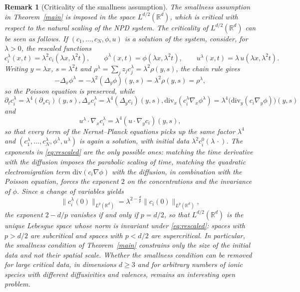\documentclass[11pt,reqno]{amsart}
\newcommand{\be}{\begin{equation}}
\newcommand{\ee}{\end{equation}}
\newtheorem{rem}[thm]{Remark}
\begin{document}
\begin{rem}[Criticality of the smallness assumption]
\label{rem:criticality}
The smallness assumption in Theorem~\ref{main} is imposed in
the space $L^{d/2}(\mathbb{R}^d)$, which is critical with respect to
the natural scaling of the NPD system.
The criticality of $L^{d/2}(\mathbb{R}^d)$ can be seen as follows. If
$(c_1,\dots,c_N,\phi,u)$ is a solution of the system, consider, for
$\lambda>0$, the rescaled functions
\be\label{eq:rescaled}
c_i^{\lambda}(x,t)=\lambda^{2}c_i(\lambda x,\lambda^{2}t),\qquad
\phi^{\lambda}(x,t)=\phi(\lambda x,\lambda^{2}t),\qquad
u^{\lambda}(x,t)=\lambda\,u(\lambda x,\lambda^{2}t).
\ee
Writing $y=\lambda x$, $s=\lambda^{2}t$ and
$\rho^{\lambda}=\sum_j z_j c_j^{\lambda}=\lambda^{2}\rho(y,s)$, the
chain rule gives
\be
-\Delta_x\phi^{\lambda}=-\lambda^{2}(\Delta_y\phi)(y,s)
=\lambda^{2}\rho(y,s)=\rho^{\lambda},
\ee so the Poisson equation is
preserved, while
\be 
\partial_t c_i^{\lambda}=\lambda^{4}(\partial_s c_i)(y,s),
\Delta_x c_i^{\lambda}=\lambda^{4}(\Delta_y c_i)(y,s),
\mathrm{div}_x(c_i^{\lambda}\nabla_x\phi^{\lambda})
=\lambda^{4}\big(\mathrm{div}_y(c_i\nabla_y\phi)\big)(y,s)
\ee and 
\be 
u^{\lambda}\cdot\nabla_x c_i^{\lambda}
=\lambda^{4}(u\cdot\nabla_y c_i)(y,s),
\ee so that every term of the
Nernst--Planck equations picks up the same factor $\lambda^{4}$ and
$(c_1^{\lambda},\dots,c_N^{\lambda},\phi^{\lambda},u^{\lambda})$ is
again a solution, with initial data
$\lambda^{2}c_i^{0}(\lambda\,\cdot)$. The exponents in
\eqref{eq:rescaled} are the only possible ones: matching the time
derivative with the diffusion imposes the parabolic scaling of time,
matching the quadratic electromigration term
$\mathrm{div}(c_i\nabla\phi)$ with the diffusion, in combination with
the Poisson equation, forces the exponent $2$ on the concentrations
and the invariance of $\phi$. Since a change of variables yields
\be\label{eq:norm-scaling}
\|c_i^{\lambda}(0)\|_{L^{p}(\mathbb{R}^d)}
=\lambda^{2-\frac{d}{p}}\|c_i(0)\|_{L^{p}(\mathbb{R}^d)},
\ee
the exponent $2-d/p$ vanishes if and only if $p=d/2$, so that
$L^{d/2}(\mathbb{R}^d)$ is the unique Lebesgue space whose norm is
invariant under \eqref{eq:rescaled}: spaces with $p>d/2$ are
subcritical and spaces with $p<d/2$ are supercritical. In particular,
the smallness condition of Theorem~\ref{main} constrains only
the size of the initial data and not their spatial scale.
 Whether the smallness
condition can be removed for large critical data, in dimensions
$d \ge 3$ and for arbitrary numbers of ionic species with different
diffusivities and valences, remains an interesting open problem.
\end{rem}
\end{document}
